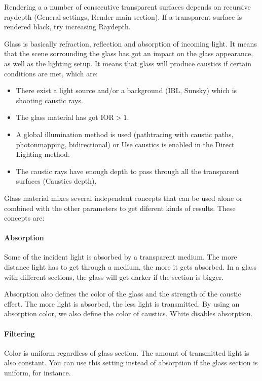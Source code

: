 Rendering a a number of consecutive transparent surfaces depends on recursive raydepth (General settings, Render main section). If a transparent surface is rendered black, try increasing Raydepth.

Glass is basically refraction, reflection and absorption of incoming light. It means that the scene sorrounding the glass has got an impact on the glass appearance, as well as the lighting setup. It means that glass will produce caustics if certain conditions are met, which are:

\begin{itemize}
\item There exist a light source and/or a background (IBL, Sunsky) which is shooting caustic rays.
\item The glass material has got $\text{IOR}>1$.
\item A global illumination method is used (pathtracing with caustic paths, photonmapping, bidirectional) or Use caustics is enabled in the Direct Lighting method.
\item The caustic rays have enough depth to pass through all the transparent surfaces (Caustics depth).
\end{itemize}

Glass material mixes several independent concepts that can be used alone or combined with the other parameters to get diferent kinds of results. These concepts are:

\paragraph{Absorption}

Some of the incident light is absorbed by a transparent medium. The more distance light has to get through a medium, the more it gets absorbed. In a glass with different sections, the glass will get darker if the section is bigger.

Absorption also defines the color of the glass and the strength of the caustic effect. The more light is absorbed, the less light is transmitted. By using an absorption color, we also define the color of caustics. White disables absorption.

\paragraph{Filtering}

Color is uniform regardless of glass section. The amount of transmitted light is also constant. You can use this setting instead of absorption if the glass section is uniform, for instance.

